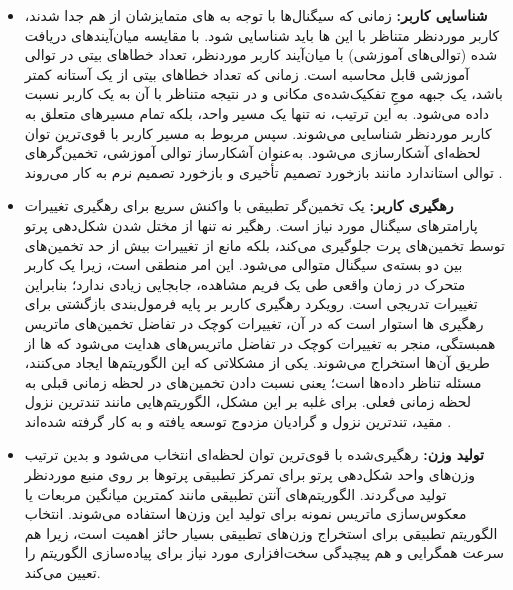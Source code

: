 \begin{itemize}
	\item \textbf{شناسایی کاربر:} زمانی که سیگنال‌ها با توجه به های متمایزشان از هم جدا شدند، کاربر موردنظر متناظر با این ها باید شناسایی شود. با مقایسه میان‌آیندهای دریافت شده (توالی‌های آموزشی) با میان‌آیند کاربر موردنظر، تعداد خطاهای بیتی در توالی آموزشی قابل محاسبه است. زمانی که تعداد خطاهای بیتی از یک آستانه کمتر باشد، یک جبهه موجِ تفکیک‌شده‌ی مکانی و در نتیجه  متناظر با آن به یک کاربر نسبت داده می‌شود. به این ترتیب، نه تنها یک مسیر واحد، بلکه تمام مسیرهای متعلق به کاربر موردنظر شناسایی می‌شوند. سپس  مربوط به مسیر کاربر با قوی‌ترین توان لحظه‌ای آشکارسازی می‌شود. به‌عنوان آشکارساز توالی آموزشی، تخمین‌گرهای توالی استاندارد مانند بازخورد تصمیم تأخیری و بازخورد تصمیم نرم به کار می‌روند \cite{6}.
	
	\item \textbf{رهگیری کاربر:} یک تخمین‌گر تطبیقی با واکنش سریع برای رهگیری تغییرات پارامترهای سیگنال مورد نیاز است. رهگیر نه تنها از مختل شدن شکل‌دهی پرتو توسط تخمین‌های پرت جلوگیری می‌کند، بلکه مانع از تغییرات بیش از حد تخمین‌های  بین دو بسته‌ی سیگنال متوالی می‌شود. این امر منطقی است، زیرا یک کاربر متحرک در زمان واقعی طی یک فریم مشاهده، جابجایی زیادی ندارد؛ بنابراین تغییرات  تدریجی است. رویکرد رهگیری کاربر بر پایه فرمول‌بندی بازگشتی برای رهگیری ها استوار است که در آن، تغییرات کوچک در تفاضل تخمین‌های ماتریس همبستگی، منجر به تغییرات کوچک در تفاضل ماتریس‌های هدایت می‌شود که ها از طریق آن‌ها استخراج می‌شوند. یکی از مشکلاتی که این الگوریتم‌ها ایجاد می‌کنند، مسئله تناظر داده‌ها است؛ یعنی نسبت دادن تخمین‌های  در لحظه زمانی قبلی به لحظه زمانی فعلی. برای غلبه بر این مشکل، الگوریتم‌هایی مانند تندترین نزول مقید، تندترین نزول و گرادیان مزدوج توسعه یافته و به کار گرفته شده‌اند \cite{7, 8}.
	
	\item \textbf{تولید وزن:}  رهگیری‌شده با قوی‌ترین توان لحظه‌ای انتخاب می‌شود و بدین ترتیب وزن‌های واحد شکل‌دهی پرتو برای تمرکز تطبیقی پرتوها بر روی منبع موردنظر تولید می‌گردند. الگوریتم‌های آنتن تطبیقی مانند کمترین میانگین مربعات یا معکوس‌سازی ماتریس نمونه \cite{9} برای تولید این وزن‌ها استفاده می‌شوند. انتخاب الگوریتم تطبیقی برای استخراج وزن‌های تطبیقی بسیار حائز اهمیت است، زیرا هم سرعت همگرایی و هم پیچیدگی سخت‌افزاری مورد نیاز برای پیاده‌سازی الگوریتم را تعیین می‌کند.
\end{itemize}




